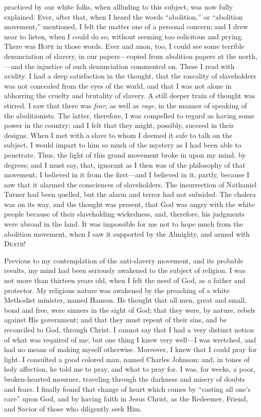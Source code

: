 practiced by our white folks, when allluding to this subject, was now
fully explained. Ever, after that, when I heard the words ``abolition,''
or ``abolition movement,'' mentioned, I felt the matter one of a
personal concern; and I drew near to listen, when I could do so, without
seeming too solicitous and prying. There was \textsc{Hope} in those
words. Ever and anon, too, I could see some terrible denunciation of
slavery, in our papers---copied from abolition papers at the
north,---and the injustice of such denunciation commented on. These I
read with avidity. I had a deep satisfaction in the thought, that the
rascality of slaveholders was not concealed from the eyes of the world,
and that I was not alone in abhorring the cruelty and brutality of
slavery. A still deeper train of thought was stirred. I saw that there
was \emph{fear}, as well as \emph{rage}, in the manner of speaking of
the abolitionists. The latter, therefore, I was compelled to regard as
having some power in the country; and I felt that they might, possibly,
succeed in their designs. When I met with a slave to whom I deemed it
safe to talk on the subject, I would impart to him so much of the
mystery as I had been able to penetrate. Thus, the light of this grand
movement broke in upon my mind, by degrees; and I must say, that,
ignorant as I then was of the philosophy of that movement, I believed in
it from the first---and I believed in it, partly, because I saw that it
alarmed the consciences of slaveholders. The insurrection of Nathaniel
Turner had been quelled, but the alarm and terror had not subsided. The
cholera was on its way, {}and the thought was present, that God was
angry with the white people because of their slaveholding wickedness,
and, therefore, his judgments were abroad in the land. It was impossible
for me not to hope much from the abolition movement, when I saw it
supported by the Almighty, and armed with \textsc{Death}!

Previous to my contemplation of the anti-slavery movement, and its
probable results, my mind had been seriously awakened to the subject of
religion. I was not more than thirteen years old, when I felt the need
of God, as a father and protector. My religious nature was awakened by
the preaching of a white Methodist minister, named Hanson. He thought
that all men, great and small, bond and free, were sinners in the sight
of God; that they were, by nature, rebels against His government; and
that they must repent of their sins, and be reconciled to God, through
Christ. I cannot say that I had a very distinct notion of what was
required of me; but one thing I knew very well---I was wretched, and had
no means of making myself otherwise. Moreover, I knew that I could pray
for light. I consulted a good colored man, named Charles Johnson; and,
in tones of holy affection, he told me to pray, and what to pray for. I
was, for weeks, a poor, broken-hearted mourner, traveling through the
darkness and misery of doubts and fears. I finally found that change of
heart which comes by ``casting all one's care'' upon God, and by having
faith in Jesus Christ, as the Redeemer, Friend, and Savior of those who
diligently seek Him.

